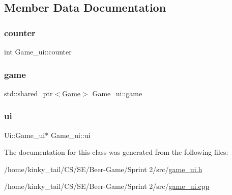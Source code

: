 \subsection{Member Data Documentation}
\mbox{\label{class_game__ui_aef6afc3dd6d9904d9f0aadccd30b7775}} 
\subsubsection{\texorpdfstring{counter}{counter}}
{\footnotesize\ttfamily int Game\+\_\+ui\+::counter\hspace{0.3cm}{\ttfamily [private]}}

\mbox{\label{class_game__ui_a687057a7aaf0f8d4d5eeeee09a68dd38}} 
\subsubsection{\texorpdfstring{game}{game}}
{\footnotesize\ttfamily std\+::shared\+\_\+ptr$<$\hyperlink{class_game}{Game}$>$ Game\+\_\+ui\+::game\hspace{0.3cm}{\ttfamily [private]}}

\mbox{\label{class_game__ui_a9ae0a3d7e53c8beec44db17065012192}} 
\subsubsection{\texorpdfstring{ui}{ui}}
{\footnotesize\ttfamily Ui\+::\+Game\+\_\+ui$\ast$ Game\+\_\+ui\+::ui\hspace{0.3cm}{\ttfamily [private]}}



The documentation for this class was generated from the following files\+:\begin{DoxyCompactItemize}
\item 
/home/kinky\+\_\+tail/\+C\+S/\+S\+E/\+Beer-\/\+Game/\+Sprint 2/src/\hyperlink{game__ui_8h}{game\+\_\+ui.\+h}\item 
/home/kinky\+\_\+tail/\+C\+S/\+S\+E/\+Beer-\/\+Game/\+Sprint 2/src/\hyperlink{game__ui_8cpp}{game\+\_\+ui.\+cpp}\end{DoxyCompactItemize}

